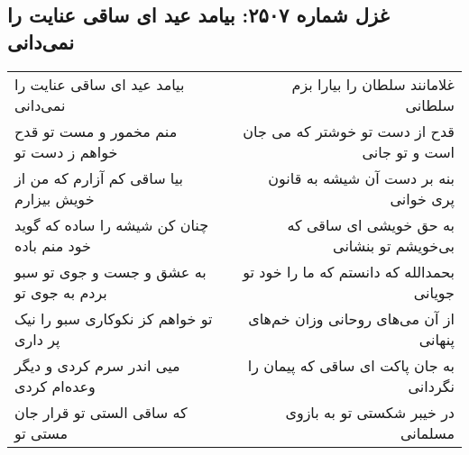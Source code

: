 \begin{center}
\section*{غزل شماره ۲۵۰۷: بیامد عید ای ساقی عنایت را نمی‌دانی}
\label{sec:2507}
\begin{longtable}{l p{0.5cm} r}
بیامد عید ای ساقی عنایت را نمی‌دانی
&&
غلامانند سلطان را بیارا بزم سلطانی
\\
منم مخمور و مست تو قدح خواهم ز دست تو
&&
قدح از دست تو خوشتر که می جان است و تو جانی
\\
بیا ساقی کم آزارم که من از خویش بیزارم
&&
بنه بر دست آن شیشه به قانون پری خوانی
\\
چنان کن شیشه را ساده که گوید خود منم باده
&&
به حق خویشی ای ساقی که بی‌خویشم تو بنشانی
\\
به عشق و جست و جوی تو سبو بردم به جوی تو
&&
بحمدالله که دانستم که ما را خود تو جویانی
\\
تو خواهم کز نکوکاری سبو را نیک پر داری
&&
از آن می‌های روحانی وزان خم‌های پنهانی
\\
میی اندر سرم کردی و دیگر وعده‌ام کردی
&&
به جان پاکت ای ساقی که پیمان را نگردانی
\\
که ساقی الستی تو قرار جان مستی تو
&&
در خیبر شکستی تو به بازوی مسلمانی
\\
\end{longtable}
\end{center}
